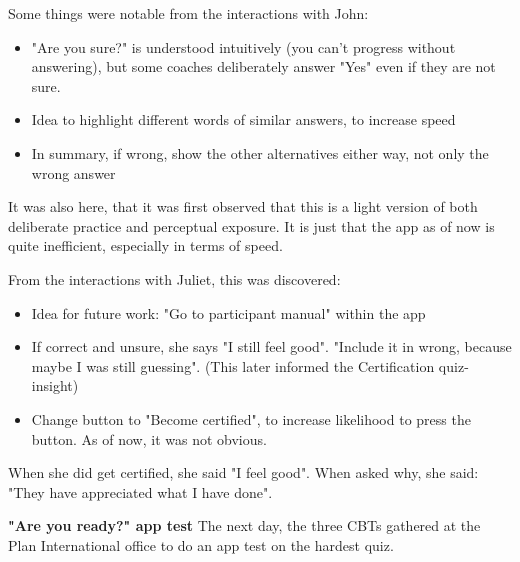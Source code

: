     Some things were notable from the interactions with John:
    \begin{itemize}
    \item "Are you sure?" is understood intuitively (you can't progress without answering), but some coaches deliberately answer "Yes" even if they are not sure.
    \item Idea to highlight different words of similar answers, to increase speed
    \item In summary, if wrong, show the other alternatives either way, not only the wrong answer
    \end{itemize}

    It was also here, that it was first observed that this is a light version of both deliberate practice and perceptual exposure. It is just that the app as of now is quite inefficient, especially in terms of speed.


    From the interactions with Juliet, this was discovered:

    \begin{itemize}
    \item Idea for future work: "Go to participant manual" within the app
    \item If correct and unsure, she says "I still feel good". "Include it in wrong, because maybe I was still guessing". (This later informed the Certification quiz-insight)
    \item Change button to "Become certified", to increase likelihood to press the button. As of now, it was not obvious.
    \end{itemize}

    When she did get certified, she said "I feel good". When asked why, she said: "They have appreciated what I have done".

    \textbf{"Are you ready?" app test}
    The next day, the three CBTs gathered at the Plan International office to do an app test on the hardest quiz.

